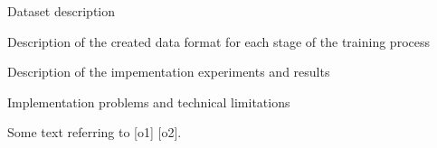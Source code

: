 Dataset description

Description of the created data format for each stage of the training process

Description of the impementation experiments and results

Implementation problems and technical limitations

Some text referring to [o1] [o2].


